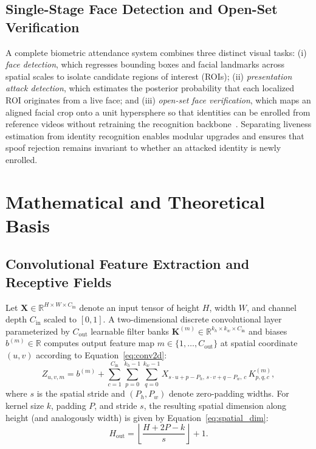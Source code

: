 \subsection{Single-Stage Face Detection and Open-Set Verification}

A complete biometric attendance system combines three distinct visual tasks: (i) \emph{face detection}, which regresses bounding boxes and facial landmarks across spatial scales to isolate candidate regions of interest (ROIs); (ii) \emph{presentation attack detection}, which estimates the posterior probability that each localized ROI originates from a live face; and (iii) \emph{open-set face verification}, which maps an aligned facial crop onto a unit hypersphere so that identities can be enrolled from reference videos without retraining the recognition backbone~\cite{deng2019arcface}. Separating liveness estimation from identity recognition enables modular upgrades and ensures that spoof rejection remains invariant to whether an attacked identity is newly enrolled.

\section{Mathematical and Theoretical Basis}
\label{sec:mathematical_basis}

\subsection{Convolutional Feature Extraction and Receptive Fields}

Let $\mathbf{X} \in \mathbb{R}^{H \times W \times C_{\text{in}}}$ denote an input tensor of height $H$, width $W$, and channel depth $C_{\text{in}}$ scaled to $[0, 1]$. A two-dimensional discrete convolutional layer parameterized by $C_{\text{out}}$ learnable filter banks $\mathbf{K}^{(m)} \in \mathbb{R}^{k_h \times k_w \times C_{\text{in}}}$ and biases $b^{(m)} \in \mathbb{R}$ computes output feature map $m \in \{1, \dots, C_{\text{out}}\}$ at spatial coordinate $(u, v)$ according to Equation~\eqref{eq:conv2d}:
\begin{equation}
\label{eq:conv2d}
    Z_{u, v, m} = b^{(m)} + \sum_{c=1}^{C_{\text{in}}} \sum_{p=0}^{k_h - 1} \sum_{q=0}^{k_w - 1} X_{s \cdot u + p - P_h,\, s \cdot v + q - P_w,\, c} \, K^{(m)}_{p, q, c},
\end{equation}
where $s$ is the spatial stride and $(P_h, P_w)$ denote zero-padding widths. For kernel size $k$, padding $P$, and stride $s$, the resulting spatial dimension along height (and analogously width) is given by Equation~\eqref{eq:spatial_dim}:
\begin{equation}
\label{eq:spatial_dim}
    H_{\text{out}} = \left\lfloor \frac{H + 2P - k}{s} \right\rfloor + 1.
\end{equation}

